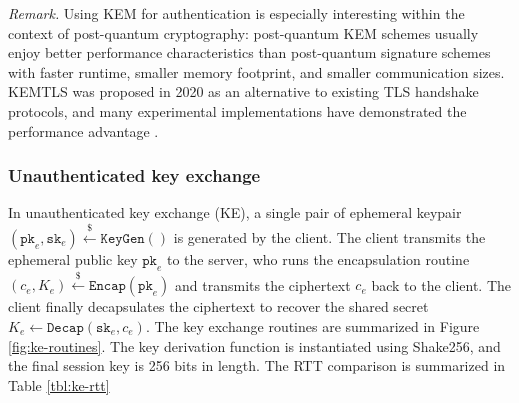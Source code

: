 \documentclass[journal=tches,submission]{iacrtrans}
\newcommand{\keygen}{\texttt{KeyGen}}
\newcommand{\encap}{\texttt{Encap}}
\newcommand{\decap}{\texttt{Decap}}
\newcommand{\pk}{\texttt{pk}}
\newcommand{\sk}{\texttt{sk}}
\newcommand{\leftsample}{\stackrel{\$}{\leftarrow}}
\begin{document}
\emph{Remark.} Using KEM for authentication is especially interesting within the context of post-quantum cryptography: post-quantum KEM schemes usually enjoy better performance characteristics than post-quantum signature schemes with faster runtime, smaller memory footprint, and smaller communication sizes. KEMTLS was proposed in 2020 as an alternative to existing TLS handshake protocols, and many experimental implementations have demonstrated the performance advantage \cite{DBLP:conf/ccs/SchwabeSW20}.

\subsubsection{Unauthenticated key exchange}\label{sec:unauthenticated-key-exchange}
In unauthenticated key exchange (KE), a single pair of ephemeral keypair $(\pk_e, \sk_e) \leftsample \keygen()$ is generated by the client. The client transmits the ephemeral public key $\pk_e$ to the server, who runs the encapsulation routine $(c_e, K_e) \leftsample \encap(\pk_e)$ and transmits the ciphertext $c_e$ back to the client. The client finally decapsulates the ciphertext to recover the shared secret $K_e \leftarrow \decap(\sk_e, c_e)$. The key exchange routines are summarized in Figure \ref{fig:ke-routines}. The key derivation function is instantiated using Shake256, and the final session key is 256 bits in length. The RTT comparison is summarized in Table \ref{tbl:ke-rtt}
\end{document}
